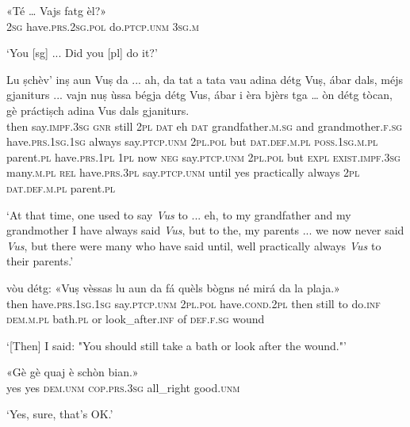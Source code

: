 \begin{linenumbers}
\gll «Té\footnotemark{} … Vajs fatg èl?»   \\
 \textsc{2sg} {} have.\textsc{prs.2sg.pol} do.\textsc{ptcp.unm} \textsc{3sg.m}\\
\end{linenumbers}
\medskip
\glt `You [sg] ... Did you [pl] do it?'
\medskip

\begin{linenumbers}
\gll  Lu ṣchèv’ inṣ aun Vuṣ da ... ah, da tat a tata vau adina détg Vuṣ, ábar dals, méjs gjaniturs ... vajn nuṣ ùssa bégja détg Vus, ábar i èra bjèrs tga … òn détg tòcan, gè práctiṣch adina Vus dals gjaniturs.  \\
then say.\textsc{impf.3sg} \textsc{gnr} still  \textsc{2pl} \textsc{dat} {} eh \textsc{dat} grandfather.\textsc{m.sg} and grandmother.\textsc{f.sg} have.\textsc{prs.1sg.1sg} always say.\textsc{ptcp.unm} \textsc{2pl.pol} but \textsc{dat.def.m.pl} \textsc{poss.1sg.m.pl} parent.\textsc{pl} {} have.\textsc{prs.1pl} \textsc{1pl} now \textsc{neg} say.\textsc{ptcp.unm} \textsc{2pl.pol} but \textsc{expl} \textsc{exist.impf.3sg} many.\textsc{m.pl} \textsc{rel} {} have.\textsc{prs.3pl} say.\textsc{ptcp.unm} until yes practically always \textsc{2pl} \textsc{dat.def.m.pl} parent.\textsc{pl}\\
\end{linenumbers}
\medskip
\glt `At that time, one used to say \textit{Vus} to ... eh, to my grandfather and my grandmother I have always said \textit{Vus}, but to the, my parents ... we now never said \textit{Vus}, but there were many who have said until, well practically always \textit{Vus} to their parents.'
\medskip

\begin{linenumbers}
\gll  [Lu] vòu détg:  «Vuṣ vèssas lu aun da fá quèls bògns né mirá da la plaja.»  \\
then have.\textsc{prs.1sg.1sg} say.\textsc{ptcp.unm} \textsc{2pl.pol}  have.\textsc{cond.2pl} then still to  do.\textsc{inf} \textsc{dem.m.pl} bath.\textsc{pl} or look\_after.\textsc{inf} of \textsc{def.f.sg} wound\\
\end{linenumbers}
\medskip
\glt `[Then] I said: "You should still take a bath or look after the wound."'
\medskip

\begin{linenumbers}
\gll  «Gè gè quaj è schòn bian.»  \\
yes yes \textsc{dem.unm} \textsc{cop.prs.3sg} all\_right good.\textsc{unm}  \\
\end{linenumbers}
\medskip
\glt `Yes, sure, that’s OK.'
\medskip

